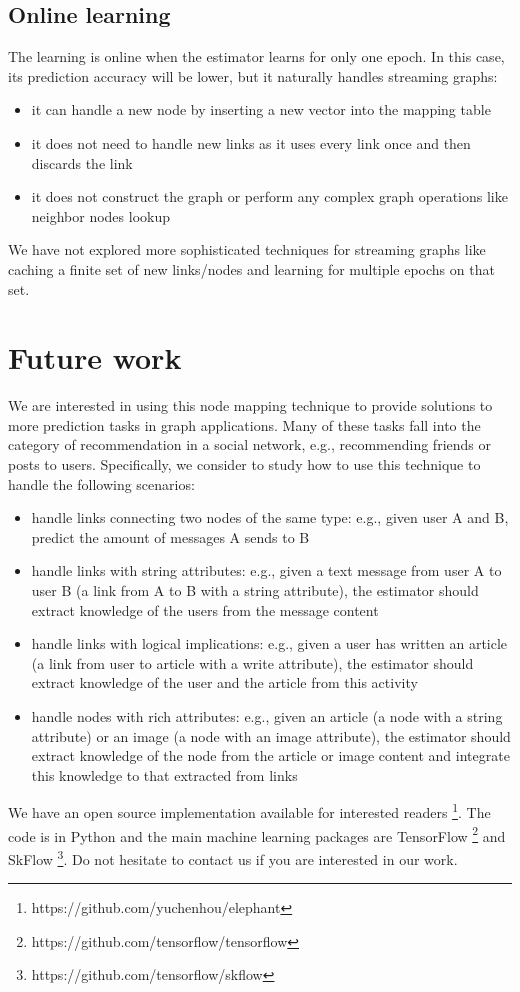 \documentclass[twocolumn]{article}
\begin{document}
\subsection{Online learning}
The learning is online when the estimator learns for only one epoch. In 
this case, its prediction accuracy will be lower, but it naturally handles 
streaming graphs:
\begin{itemize}
	\item it can handle a new node by inserting a new vector into the mapping 
	table
	\item it does not need to handle new links as it uses every link once and 
	then discards the link
	\item it does not construct the graph or perform any complex graph 
	operations like neighbor nodes lookup
\end{itemize}
We have not explored more sophisticated techniques for streaming graphs like 
caching a finite set of new links/nodes and learning for multiple epochs on 
that set.

\section{Future work}
We are interested in using this node mapping technique to provide solutions to 
more prediction tasks in graph applications. Many of these tasks fall into the 
category of recommendation in a social network, e.g., recommending friends or 
posts to users.
Specifically, we consider to study how to use this technique to handle the 
following scenarios:
\begin{itemize}
	\item handle links connecting two nodes of the same type: e.g., given user 
	A and B, predict the amount of messages A sends to B
	\item handle links with string attributes: e.g., given a text message from 
	user A to user B (a link from A to B with a string attribute), the 
	estimator should extract knowledge of the users from the message content
	\item handle links with logical implications: e.g., given a user has 
	written an article (a link from user to article with a write attribute), 
	the estimator should extract knowledge of the user and the article from 
	this activity
	\item handle nodes with rich attributes: e.g., given an article (a node 
	with a string attribute) or an image (a node with an image attribute), the 
	estimator should extract knowledge of the node from the article or image 
	content and integrate this knowledge to that extracted from links
\end{itemize}
We have an open source implementation available for interested readers  
\footnote{https://github.com/yuchenhou/elephant}.
The code is in Python and the main machine learning packages are TensorFlow 
\cite{abadi2016tensorflow} \footnote{https://github.com/tensorflow/tensorflow} 
and SkFlow \footnote{https://github.com/tensorflow/skflow}.
Do not hesitate to contact us if you are interested in our work.
\end{document}
